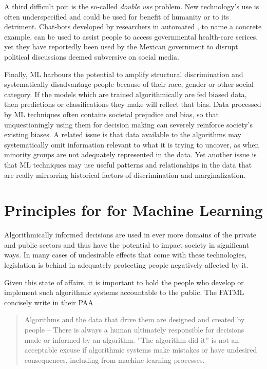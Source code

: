 \documentclass{article}
\begin{document}
A third difficult poit is the so-called \emph{double use} problem. New technology's use is often underspecified and could be used for benefit of humanity or to its detriment. Chat-bots developed by researchers in automated , to name a concrete example, can be used to assist people to access governmental health-care serices, yet they have reportedly been used by the Mexican government to disrupt political discussions deemed subversive on social media. \cite{leidner2017ethical}

Finally, ML harbours the potential to amplify structural discrimination and systematically disadvantage people because of their race, gender or other social category. If the models which are trained algorithmically are fed biased data, then predictions or classifications they make will reflect that bias.
Data processed by ML techniques often contains societal prejudice and bias, so that unquestioningly using them for decision making can severely reinforce society's existing biases. A related issue is that data available to the algorithms may systematically omit information relevant to what it is trying to uncover, as when minority groups are not adequately represented in the data. Yet another issue is that ML techniques may use useful patterns and relationships in the data that are really mirrorring historical factors of discrimination and marginalization. \cite{barocas2016big}

\section{Principles for  for Machine Learning}\hypertarget{sec3}{}
Algorithmically informed decisions are used in ever more domains of the private and public sectors and thus have the potential to impact society in significant ways. In many cases of undesirable effects that come with these technologies, legislation is behind in adequately protecting people negatively affected by it.

Given this state of affairs, it is important to hold the people who develop or implement such algorithmic systems accountable to the public. The FATML concisely write in their PAA \cite{principles}
\begin{quote}
Algorithms and the data that drive them are designed and created by people -- There is always a human ultimately responsible for decisions made or informed by an algorithm. ''The algorithm did it'' is not an acceptable excuse if algorithmic systems make mistakes or have undesired consequences, including from machine-learning processes.
\end{quote}
\end{document}
